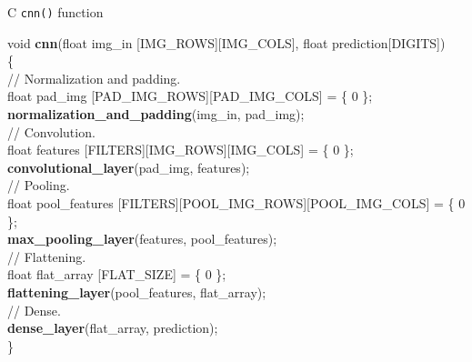 \documentclass[10pt, xcolor=dvipsnames, compress]{beamer}
\begin{document}
\begin{frame}{C \texttt{cnn()} function}



    {
        \ttfamily
        \footnotesize
        void \textbf{cnn}(float img\_in [IMG\_ROWS][IMG\_COLS], float prediction[DIGITS])\\
        \{ \\
        \hspace*{1em}// Normalization and padding.\\
        \hspace*{1em}float pad\_img [PAD\_IMG\_ROWS][PAD\_IMG\_COLS] = \{ 0 \};\\
        \hspace*{1em}\textbf{normalization\_and\_padding}(img\_in, pad\_img);\\
        \hspace*{1em}// Convolution.\\
        \hspace*{1em}float features [FILTERS][IMG\_ROWS][IMG\_COLS] = \{ 0 \};\\
        \hspace*{1em}\textbf{convolutional\_layer}(pad\_img, features);\\
        \hspace*{1em}// Pooling.\\
        \hspace*{1em}float pool\_features [FILTERS][POOL\_IMG\_ROWS][POOL\_IMG\_COLS] = \{ 0 \};\\
        \hspace*{1em}\textbf{max\_pooling\_layer}(features, pool\_features);\\
        \hspace*{1em}// Flattening.\\
        \hspace*{1em}float flat\_array [FLAT\_SIZE] = \{ 0 \};\\
        \hspace*{1em}\textbf{flattening\_layer}(pool\_features, flat\_array);\\
        \hspace*{1em}// Dense.\\
        \hspace*{1em}\textbf{dense\_layer}(flat\_array, prediction);\\
        \} \\
    }

\end{frame}
\end{document}
